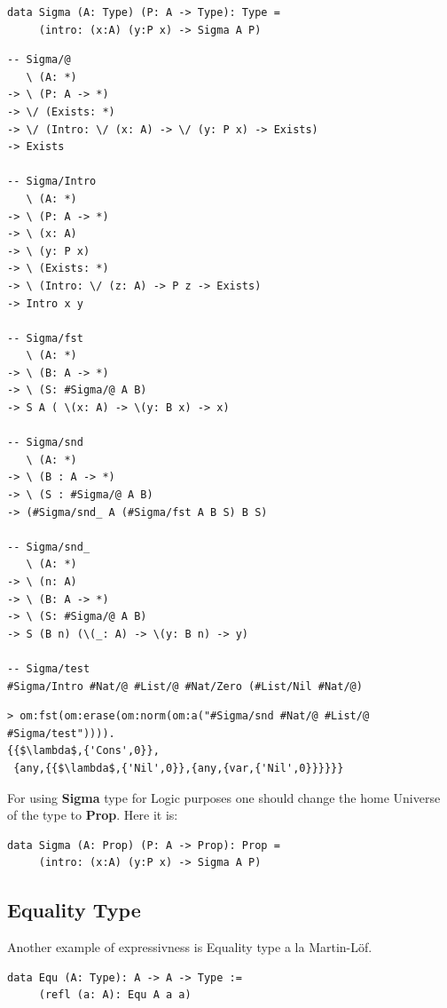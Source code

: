 \documentclass[11pt,oneside]{article}
\begin{document}
\begin{lstlisting}[mathescape=true]
data Sigma (A: Type) (P: A -> Type): Type =
     (intro: (x:A) (y:P x) -> Sigma A P)
\end{lstlisting}

\begin{lstlisting}[mathescape=true]
-- Sigma/@
   \ (A: *)
-> \ (P: A -> *)
-> \/ (Exists: *)
-> \/ (Intro: \/ (x: A) -> \/ (y: P x) -> Exists)
-> Exists

-- Sigma/Intro
   \ (A: *)
-> \ (P: A -> *)
-> \ (x: A)
-> \ (y: P x)
-> \ (Exists: *)
-> \ (Intro: \/ (z: A) -> P z -> Exists)
-> Intro x y

-- Sigma/fst
   \ (A: *)
-> \ (B: A -> *)
-> \ (S: #Sigma/@ A B)
-> S A ( \(x: A) -> \(y: B x) -> x)

-- Sigma/snd
   \ (A: *)
-> \ (B : A -> *)
-> \ (S : #Sigma/@ A B)
-> (#Sigma/snd_ A (#Sigma/fst A B S) B S)

-- Sigma/snd_
   \ (A: *)
-> \ (n: A)
-> \ (B: A -> *)
-> \ (S: #Sigma/@ A B)
-> S (B n) (\(_: A) -> \(y: B n) -> y)

-- Sigma/test
#Sigma/Intro #Nat/@ #List/@ #Nat/Zero (#List/Nil #Nat/@)
\end{lstlisting}

\begin{lstlisting}[mathescape=true]
> om:fst(om:erase(om:norm(om:a("#Sigma/snd #Nat/@ #List/@ #Sigma/test")))).
{{$\lambda$,{'Cons',0}},
 {any,{{$\lambda$,{'Nil',0}},{any,{var,{'Nil',0}}}}}}
\end{lstlisting}

For using {\bf Sigma} type for Logic purposes one should change the
home Universe of the type to {\bf Prop}. Here it is:

\begin{lstlisting}[mathescape=true]
data Sigma (A: Prop) (P: A -> Prop): Prop =
     (intro: (x:A) (y:P x) -> Sigma A P)
\end{lstlisting}

\newpage
\subsection{Equality Type}

Another example of expressivness is Equality type a la Martin-Löf.

\begin{lstlisting}[mathescape=true]
data Equ (A: Type): A -> A -> Type :=
     (refl (a: A): Equ A a a)
\end{lstlisting}
\end{document}
